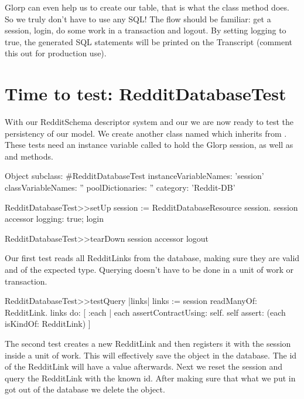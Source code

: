 \documentclass[a4paper,10pt,twoside]{book}
\begin{document}
Glorp can even help us to create our  table, that is what the  class method does. So we truly don't have to use any SQL! The flow should be familiar: get a session, login, do some work in a transaction and logout. By setting logging to true, the generated SQL statements will be printed on the Transcript (comment this out for production use).


\section{Time to test: RedditDatabaseTest}\label{sec:databasetest}

With our RedditSchema descriptor system and our  we are now ready to test the persistency of our model. We create another class named  which inherits from . These tests need an instance variable called  to hold the Glorp session, as well as  and  methods.


\begin{code}{}
Object subclass: #RedditDatabaseTest
   instanceVariableNames: 'session' 
   classVariableNames: '' 
   poolDictionaries: '' 
   category: 'Reddit-DB'
\end{code}

\begin{code}{}
RedditDatabaseTest>>setUp
     session := RedditDatabaseResource session.
     session accessor logging: true; login
\end{code}

\begin{code}{}
RedditDatabaseTest>>tearDown
     session accessor logout
\end{code}


Our first test reads all RedditLinks from the database, making sure they are valid and of the expected type. Querying doesn't have to be done in a unit of work or transaction.

\begin{code}{}
RedditDatabaseTest>>testQuery
    |links|
    links := session readManyOf: RedditLink.
     links do: [ :each |
                 each assertContractUsing: self. 
                 self assert: (each isKindOf: RedditLink) ]
\end{code}


The second test creates a new RedditLink and then registers it with the session inside a unit of work. This will effectively save the object in the database. The id of the RedditLink will have a value afterwards. Next we reset the session and query the RedditLink with the known id. After making sure that what we put in got out of the database we delete the object.
\end{document}
